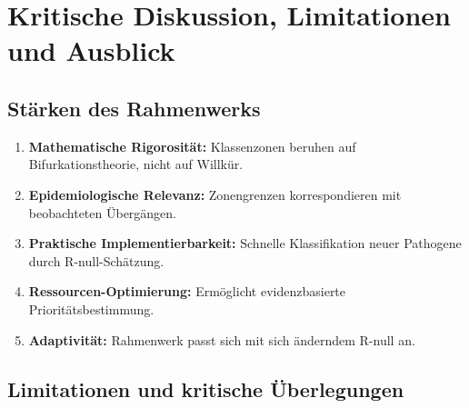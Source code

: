 ﻿\documentclass[a4paper,12pt,twoside]{article}
\theoremstyle{definition}
\begin{document}
\section{Kritische Diskussion, Limitationen und Ausblick}
\label{sec:discussion}

\subsection{Stärken des Rahmenwerks}

\begin{enumerate}
\item \textbf{Mathematische Rigorosität:} Klassenzonen beruhen auf Bifurkationstheorie, nicht auf Willkür.
\item \textbf{Epidemiologische Relevanz:} Zonengrenzen korrespondieren mit beobachteten Übergängen.
\item \textbf{Praktische Implementierbarkeit:} Schnelle Klassifikation neuer Pathogene durch R-null-Schätzung.
\item \textbf{Ressourcen-Optimierung:} Ermöglicht evidenzbasierte Prioritätsbestimmung.
\item \textbf{Adaptivität:} Rahmenwerk passt sich mit sich änderndem R-null an.
\end{enumerate}

\subsection{Limitationen und kritische Überlegungen}
\end{document}
